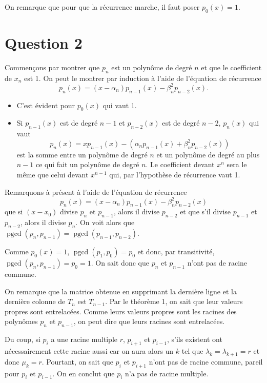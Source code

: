 \documentclass{article}
\DeclareMathOperator{\pgcd}{pgcd} %
\DeclareMathOperator{\newdiff}{d} %
\newcommand{\dif}{\newdiff\!}
\begin{document}
On remarque que pour que la récurrence marche,
il faut poser $p_0(x) = 1$.

\section*{Question 2}
Commençons par montrer que $p_n$ est un polynôme de degré $n$ et que le
coefficient de $x_n$ est 1.
On peut le montrer par induction à l'aide de l'équation de récurrence
\[ p_n(x) = (x - \alpha_n)p_{n-1}(x) - \beta_n^2p_{n-2}(x). \]
\begin{itemize}
  \item C'est évident pour $p_0(x)$ qui vaut 1.
  \item Si $p_{n-1}(x)$ est de degré $n-1$ et $p_{n-2}(x)$ est de degré
    $n-2$, $p_n(x)$ qui vaut
    \[ p_n(x) = xp_{n-1}(x) - (\alpha_np_{n-1}(x) + \beta_n^2p_{n-2}(x)) \]
    est la somme entre un polynôme de degré $n$ et un polynôme de
    degré au plus $n-1$ ce qui fait un polynôme de degré $n$.
    Le coefficient devant $x^n$ sera le même que celui devant $x^{n-1}$ qui,
    par l'hypothèse de récurrence vaut 1.
\end{itemize}

Remarquons à présent à l'aide de l'équation de récurrence
\[ p_n(x) = (x - \alpha_n)p_{n-1}(x) - \beta_n^2p_{n-2}(x) \]
que si $(x-x_0)$ divise $p_n$ et $p_{n-1}$, alors il divise
$p_{n-2}$ et que s'il divise $p_{n-1}$ et $p_{n-2}$, alors il divise $p_n$.
On voit alors que $\pgcd(p_n, p_{n-1}) = \pgcd(p_{n-1}, p_{n-2})$.

Comme $p_0(x) = 1$, $\pgcd(p_1,p_0) = p_0$ et donc, par transitivité,
$\pgcd(p_n, p_{n-1}) = p_0 = 1$.
On sait donc que $p_n$ et $p_{n-1}$ n'ont pas de racine commune.

On remarque que la matrice obtenue en supprimant
la dernière ligne et la dernière colonne de $T_n$ est $T_{n-1}$.
Par le théorème 1, on sait que leur valeurs propres sont entrelacées.
Comme leurs valeurs propres sont les racines des polynômes $p_n$ et $p_{n-1}$, on peut dire que leurs racines sont entrelacées.

Du coup, si $p_i$ a une racine multiple $r$, $p_{i+1}$ et $p_{i-1}$,
s'ils existent ont nécessairement cette racine aussi car on aura alors
un $k$ tel que $\lambda_k = \lambda_{k+1} = r$ et donc $\mu_{k} = r$.
Pourtant, on sait que $p_i$ et $p_{i+1}$ n'ont pas de racine commune,
pareil pour $p_i$ et $p_{i-1}$.
On en conclut que $p_i$ n'a pas de racine multiple.
\end{document}
